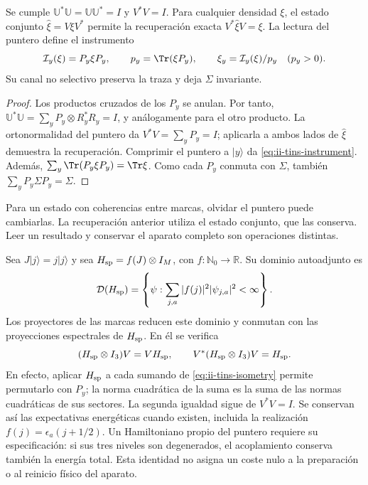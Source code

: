 \begin{proposition}
\label{prop:ii-tins-instrument}
Se cumple $\mathbb U^*\mathbb U=\mathbb U\mathbb U^*=I$ y $V^*V=I$.
Para cualquier densidad $\xi$, el estado conjunto $\widehat\xi=V\xi V^*$
permite la recuperación exacta $V^*\widehat\xi V=\xi$. La lectura del
puntero define el instrumento
\begin{equation}
 \mathcal I_y(\xi)=P_y\xi P_y,\qquad
 p_y=\Tr(\xi P_y),\qquad
 \xi_y=\mathcal I_y(\xi)/p_y\quad(p_y>0).
 \label{eq:ii-tins-instrument}
\end{equation}
Su canal no selectivo preserva la traza y deja $\Sigma$ invariante.
\end{proposition}
\begin{proof}
Los productos cruzados de los $P_y$ se anulan. Por tanto,
$\mathbb U^*\mathbb U=\sum_yP_y\otimes R_y^*R_y=I$, y análogamente
para el otro producto. La ortonormalidad del puntero da $V^*V=\sum_yP_y=I$;
aplicarla a ambos lados de $\widehat\xi$ demuestra la recuperación.
Comprimir el puntero a $|y\rangle$ da \eqref{eq:ii-tins-instrument}.
Además, $\sum_y\Tr(P_y\xi P_y)=\Tr\xi$. Como cada $P_y$ conmuta con
$\Sigma$, también $\sum_yP_y\Sigma P_y=\Sigma$.
\end{proof}

Para un estado con coherencias entre marcas, olvidar el puntero puede
cambiarlas. La recuperación anterior utiliza el estado conjunto, que las
conserva. Leer un resultado y conservar el aparato completo son operaciones
distintas.

Sea $J|j\rangle=j|j\rangle$ y sea $H_{\rm sp}=f(J)\otimes I_M$, con
$f:\mathbb N_0\to\mathbb R$. Su dominio autoadjunto es
\[
 \mathcal D(H_{\rm sp})=
 \left\{\psi:\sum_{j,a}|f(j)|^2|\psi_{j,a}|^2<\infty\right\}.
\]
Los proyectores de las marcas reducen este dominio y conmutan con las
proyecciones espectrales de $H_{\rm sp}$. En él se verifica
\begin{equation}
 (H_{\rm sp}\otimes I_3)V=VH_{\rm sp},\qquad
 V^*(H_{\rm sp}\otimes I_3)V=H_{\rm sp}.
 \label{eq:ii-tins-energy}
\end{equation}
En efecto, aplicar $H_{\rm sp}$ a cada sumando de
\eqref{eq:ii-tins-isometry} permite permutarlo con $P_y$; la norma
cuadrática de la suma es la suma de las normas cuadráticas de sus sectores.
La segunda igualdad sigue de $V^*V=I$. Se conservan así las expectativas
energéticas cuando existen, incluida la realización
$f(j)=\epsilon_a(j+1/2)$. Un Hamiltoniano propio del puntero requiere su
especificación: si sus tres niveles son degenerados, el acoplamiento conserva
también la energía total. Esta identidad no asigna un coste nulo a la
preparación o al reinicio físico del aparato.

